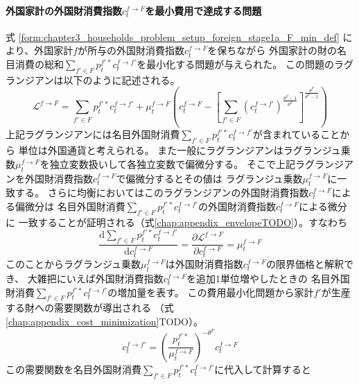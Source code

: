 \paragraph{外国家計の外国財消費指数\(c_t^{f\to F}\)を最小費用で達成する問題}
\label{sec:chapter3_households_stage1a_foreign_c_f_F_problem}
式
\eqref{form:chapter3_households_problem_setup_foreign_stage1a_F_min_def}
により、外国家計\(f\)が所与の外国財消費指数\(c_t^{f\to F}\)を保ちながら
外国家計の財の名目消費の総和\(\sum_{f'\in F}p_t^{f'*}c_t^{f\to f'}\)を最小化する問題が与えられた。
この問題のラグランジアンは以下のように記述される。
\begin{equation}
\label{form:chapter3_households_stage1a_foreign_c_f_F_problem_lagrangian_def}
    \mathcal{L}^{f\to F}=\sum_{f'\in F}p_t^{f'*}c_t^{f\to f'}+\mu_t^{f\to F}\left(c_t^{f\to F}-\left[\sum_{f'\in F}(c_t^{f\to f'})^{\frac{\theta^F-1}{\theta^F}}\right]^{\frac{\theta^F}{\theta^F-1}}\right)
\end{equation}
上記ラグランジアンには名目外国財消費\(\sum_{f'\in F}p_t^{f'*}c_t^{f\to f'}\)が含まれていることから
単位は外国通貨と考えられる。
また一般にラグランジアンはラグランジュ乗数\(\mu_t^{f\to F}\)を独立変数扱いして各独立変数で偏微分する。
そこで上記ラグランジアンを外国財消費指数\(c_t^{f\to F}\)で偏微分するとその値は
ラグランジュ乗数\(\mu_t^{f\to F}\)に一致する。
さらに均衡においてはこのラグランジアンの外国財消費指数\(c_t^{f\to F}\)による偏微分は
名目外国財消費\(\sum_{f'\in F}p_t^{f'*}c_t^{f\to f'}\)の外国財消費指数\(c_t^{f\to F}\)による微分に
一致することが証明される（式\eqref{chap:appendix_envelopeTODO}）。すなわち
\begin{equation}
\label{form:chapter3_households_stage1a_foreign_c_f_F_problem_mu_f_F_marginal_eq}
    \frac{\mathrm{d}\sum_{f'\in F}p_t^{f'*}c_t^{f\to f'}}{\mathrm{d}c_t^{f\to F}}=\frac{\partial \mathcal{L}^{f\to F}}{\partial c_t^{f\to F}}=\mu_t^{f\to F}
\end{equation}
このことからラグランジュ乗数\(\mu_t^{f\to F}\)は外国財消費指数\(c_t^{f\to F}\)の限界価格と解釈でき、
大雑把にいえば外国財消費指数\(c_t^{f\to F}\)を追加1単位増やしたときの
名目外国財消費\(\sum_{f'\in F}p_t^{f'*}c_t^{f\to f'}\)の増加量を表す。
この費用最小化問題から家計\(f'\)が生産する財への需要関数が導出される
（式\eqref{chap:appendix_cost_minimization}TODO）。
\begin{equation}
\label{form:chapter3_households_stage1a_foreign_c_f_F_problem_c_f_f_eq}
    c_t^{f\to f'}=\left(\frac{p_t^{f'*}}{\mu_t^{f\to F}}\right)^{-\theta^F}c_t^{f\to F}
\end{equation}
この需要関数を名目外国財消費\(\sum_{f'\in F}p_t^{f'*}c_t^{f\to f'}\)に代入して計算すると
